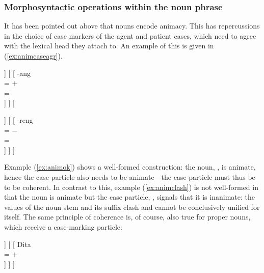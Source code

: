 \subsubsection{Morphosyntactic operations within the noun phrase}

It has been pointed out above that nouns encode animacy. This has repercussions
in the choice of case markers of the agent and patient cases, which need to
agree with the lexical head they attach to. An example of this is given in 
(\ref{ex:animcaseagr}).

\pex\label{ex:animcaseagr}
\a\label{ex:animok} %
\begin{forest}
[\anno{\xhead{N}}
	[\anno{N\tsub{stem}}
		[{%
			gan \\
			\ups{\Anim} = $+$ \\
		}]
	]
	[
		[{%
			-ang \\
			\ups{\Anim} = $+$ \\
			\ups{\Case} = \Aarg{} \\
		}]
	]
]
\end{forest}

\a\label{ex:animclash} %
\ljudge*\begin{forest}
[\anno{\xhead{N}}
	[\anno{N\tsub{stem}}
		[{%
			gan \\
			\ups{\Anim} = $+$ \\
		}]
	]
	[
		[{%
			-reng \\
			\ups{\Anim} = $-$ \\
			\ups{\Case} = \Aarg{} \\
		}]
	]
]
\end{forest}
\xe

Example (\ref{ex:animok}) shows a well-formed construction: the noun,
, is animate, hence the case particle also needs to be 
animate---the case particle must thus be  to be coherent. In
contrast to this, example (\ref{ex:animclash}) is not well-formed in that the
noun is animate but the case particle, , signals that it is
inanimate: the \Anim{} values of the noun stem and its suffix clash and cannot
be conclusively unified for  itself. The same principle of coherence
is, of course, also true for proper nouns, which receive a case-marking
particle:

\pex\label{ex:animcaseagrname}
\a\label{ex:animokname} %
\begin{forest}
[\anno{\xhead{N}}
	[\anno{Cl}
		[{%
			ang \\
			\ups{\Anim} = $+$ \\
			\ups{\Case} = \Aarg{} \\
		}]
	]
	[
		[{%
			Dita \\
			\ups{\Anim} = $+$ \\
		}]
	]
]
\end{forest}

